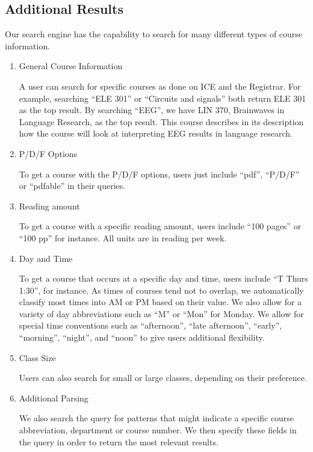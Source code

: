 \documentclass[12pt,letterpaper]{article}
\begin{document}
\subsection{Additional Results}
Our search engine has the capability to search for many different types of course information. 

\begin{enumerate}
\item General Course Information

	A user can search for specific courses as done on ICE and the Registrar. For example, searching ``ELE 301'' or ``Circuits and signals'' both return ELE 301 as the top result. By searching ``EEG'', we have LIN 370, Brainwaves in Language Research, as the top result. This course describes in its description how the course will look at interpreting EEG results in language research. 
	
\item P/D/F Options

To get a course with the P/D/F options, users just include ``pdf'', ``P/D/F'' or ``pdfable'' in their queries. 

\item Reading amount

To get a course with a specific reading amount, users include ``100 pages'' or ``100 pp'' for instance. All units are in reading per week. 

\item Day and Time

To get a course that occurs at a specific day and time, users include ``T Thurs 1:30'', for instance. As times of courses tend not to overlap, we automatically classify most times into AM or PM based on their value. We also allow for a variety of day abbreviations such as ``M'' or ``Mon'' for Monday. We allow for special time conventions such as ``afternoon'', ``late afternoon'', ``early'', ``morning'', ``night'', and ``noon'' to give users additional flexibility.

\item Class Size

Users can also search for small or large classes, depending on their preference.

\item Additional Parsing

We also search the query for patterns that might indicate a specific course abbreviation, department or course number. We then specify these fields in the query in order to return the most relevant results.  

\end{enumerate}
\end{document}
